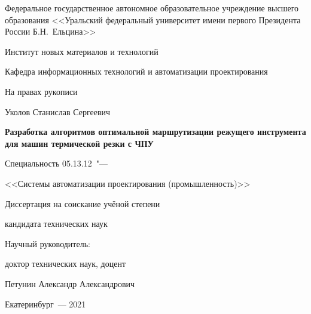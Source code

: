 \thispagestyle{empty}

\begin{center}
Федеральное государственное автономное образовательное учреждение высшего образования
<<Уральский федеральный университет
имени первого Президента России Б.Н.~Ельцина>>

Институт новых материалов и технологий

Кафедра информационных технологий и автоматизации проектирования
\end{center}
%
\vspace{0pt plus4fill} %
\begin{flushright}
На правах рукописи

\end{flushright}
%
\vspace{0pt plus6fill} %
\begin{center}
{\large
Уколов Станислав Сергеевич
}
\end{center}
%
\vspace{0pt plus1fill} %
\begin{center}
\textbf {\large %
Разработка алгоритмов оптимальной маршрутизации
режущего инструмента
для машин термической резки с ЧПУ
}

\vspace{0pt plus2fill} %
{%
Специальность 05.13.12\ "---

<<Системы автоматизации проектирования (промышленность)>>
}

\vspace{0pt plus2fill} %
Диссертация на соискание учёной степени

кандидата технических наук
\end{center}
%
\vspace{0pt plus4fill} %
\begin{flushright}

Научный руководитель:

доктор технических наук, доцент

Петунин Александр Александрович

\end{flushright}

\vspace{0pt plus4fill} %
{\centering
Екатеринбург~--- 2021
\par}

\clearpage
